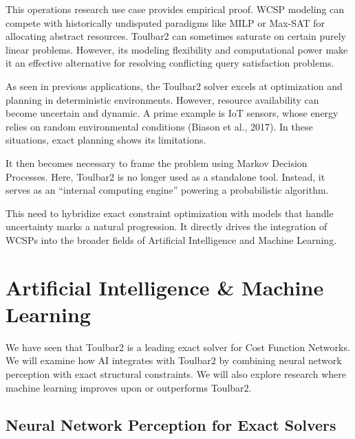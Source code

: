 \documentclass[a4paper]{article}
\begin{document}
This operations research use case provides empirical proof. \ac{WCSP} modeling can compete with historically undisputed paradigms like \ac{MILP} or Max-SAT for allocating abstract resources. 
Toulbar2 can sometimes saturate on certain purely linear problems. However, its modeling flexibility and computational power make it an effective alternative for resolving conflicting query satisfaction problems.
\newline
\newline

As seen in previous applications, the Toulbar2 solver excels at optimization and planning in deterministic environments. However, resource availability can become uncertain and dynamic. 
A prime example is IoT sensors, whose energy relies on random environmental conditions (Biason et al., 2017)\cite{ieee_transactions_on_mobile_computing}. In these situations, exact planning shows its limitations. 

It then becomes necessary to frame the problem using Markov Decision Processes. Here, Toulbar2 is no longer used as a standalone tool. Instead, it serves as an ``internal computing engine'' powering a probabilistic algorithm.

This need to hybridize exact constraint optimization with models that handle uncertainty marks a natural progression. It directly drives the integration of \acp{WCSP} into the broader fields of Artificial Intelligence and Machine Learning.


\clearpage
\section{Artificial Intelligence \& Machine Learning}

We have seen that Toulbar2 is a leading exact solver for Cost Function Networks. We will examine how AI integrates with Toulbar2 by combining neural network perception with exact structural constraints. We will also explore research where machine learning improves upon or outperforms Toulbar2.

\subsection{Neural Network Perception for Exact Solvers}
\end{document}
